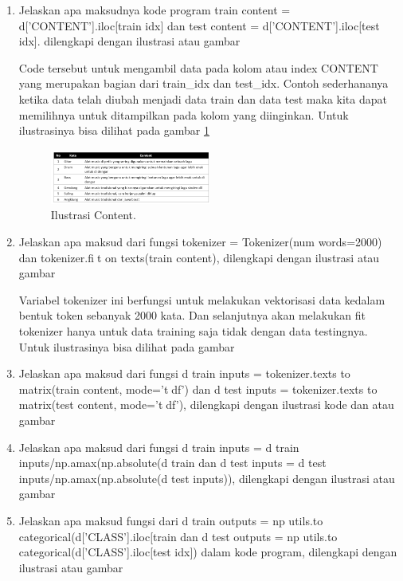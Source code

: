 \begin{enumerate}
\item Jelaskan apa maksudnya kode program train content = d['CONTENT'].iloc[train idx] dan test content = d['CONTENT'].iloc[test idx]. dilengkapi dengan ilustrasi atau gambar \par
Code tersebut untuk mengambil data pada kolom atau index CONTENT yang merupakan bagian dari train\_idx dan test\_idx. Contoh sederhananya ketika data telah diubah menjadi data train dan data test maka kita dapat memilihnya untuk ditampilkan pada kolom yang diinginkan. Untuk ilustrasinya bisa dilihat pada gambar \ref{toke4}
		\begin{figure}[!htbp]
		\centerline{\includegraphics[width=0.5\textwidth]{figures/im/toke4.png}}
		\caption{Ilustrasi Content.}
		\label{toke4}
		\end{figure}

\item Jelaskan apa maksud dari fungsi tokenizer = Tokenizer(num words=2000) dan tokenizer.fit on texts(train content), dilengkapi dengan ilustrasi atau gambar \par
Variabel tokenizer ini berfungsi untuk melakukan vektorisasi data kedalam bentuk token sebanyak 2000 kata. Dan selanjutnya akan melakukan fit tokenizer hanya untuk data training saja tidak dengan data testingnya. Untuk ilustrasinya bisa dilihat pada gambar 

\item Jelaskan apa maksud dari fungsi d train inputs = tokenizer.texts to matrix(train content, mode='tdf') dan d test inputs = tokenizer.texts to matrix(test content, mode='tdf'), dilengkapi dengan ilustrasi kode dan atau gambar \par

\item Jelaskan apa maksud dari fungsi d train inputs = d train inputs/np.amax(np.absolute(d train dan d test inputs = d test inputs/np.amax(np.absolute(d test inputs)), dilengkapi dengan ilustrasi atau gambar \par

\item Jelaskan apa maksud fungsi dari d train outputs = np utils.to categorical(d['CLASS'].iloc[train dan d test outputs = np utils.to categorical(d['CLASS'].iloc[test idx]) dalam kode program, dilengkapi dengan ilustrasi atau gambar \par


\end{enumerate}
